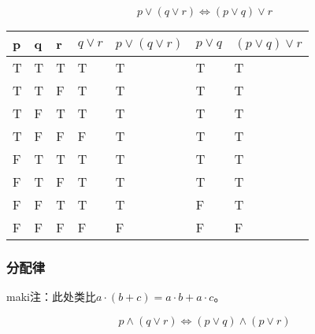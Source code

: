 \begin{equation}
    p \vee (q \vee r) \iff (p \vee q) \vee r
\end{equation}

\begin{table}[H]
    \begin{tabular}{lll|l|l|l|l}
    p & q & r & $q \vee r$ & $p \vee (q \vee r)$ & $p \vee q$ & $(p \vee q) \vee r$ \\ \hline
    T & T & T & T            & T                       & T            & T                       \\
    T & T & F & T            & T                       & T            & T                       \\
    T & F & T & T            & T                       & T            & T                       \\
    T & F & F & F            & T                       & T            & T                       \\
    F & T & T & T            & T                       & T            & T                       \\
    F & T & F & T            & T                       & T            & T                       \\
    F & F & T & T            & T                       & F            & T                       \\
    F & F & F & F            & F                       & F            & F                      
    \end{tabular}
\end{table}

\subsubsection{分配律}

maki注：此处类比$a \cdot (b + c) = a \cdot b + a \cdot c$。

\begin{equation}
    p \wedge (q \vee r) \iff (p \vee q) \wedge (p \vee r)
\end{equation}

\newpage